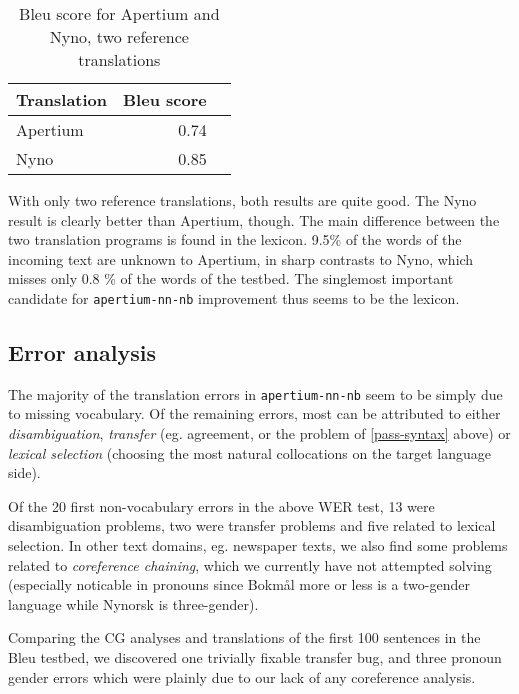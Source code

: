 \documentclass[11pt]{article}
\begin{document}
\begin{table}[htdp]
\caption{{\sc Bleu} score for Apertium and Nyno, two reference translations}
\begin{center}
\begin{tabular}{|l|r|r|}
\hline
Translation & Bleu score \\
\hline
Apertium    & 0.74 \\
Nyno        & 0.85 \\
\hline
\end{tabular}
\end{center}
\label{bleu}
\end{table}%

With only two reference translations, both results are quite good. The Nyno 
result is clearly better than Apertium, though. The main difference between 
the two translation programs is found in the lexicon. 9.5\% of the words of 
the incoming text are unknown to Apertium, in sharp
contrasts to Nyno, which misses only 0.8 \% of the words of the testbed.
The singlemost important candidate for {\tt apertium-nn-nb}
improvement thus seems to be the lexicon.


\subsection{Error analysis}
The majority of the translation errors in {\tt apertium-nn-nb} seem to
be simply due to missing vocabulary. Of the remaining errors, most can
be attributed to either \emph{disambiguation}, \emph{transfer} (eg.
agreement, or the problem of \ref{pass-syntax} above) or \emph{lexical
  selection} (choosing the most natural collocations on the target
language side).

Of the 20 first non-vocabulary errors in the above WER test, 13 were
disambiguation problems, two were transfer problems and five related
to lexical selection. In other text domains, eg. newspaper texts, we
also find some problems related to \emph{coreference chaining}, which
we currently have not attempted solving (especially noticable in
pronouns since Bokmål more or less is a two-gender language while
Nynorsk is three-gender). 

Comparing the CG analyses and translations of the first 100 sentences
in the {\sc Bleu} testbed, we discovered one trivially fixable
transfer bug, and three pronoun gender errors which were plainly due
to our lack of any coreference analysis.
\end{document}
